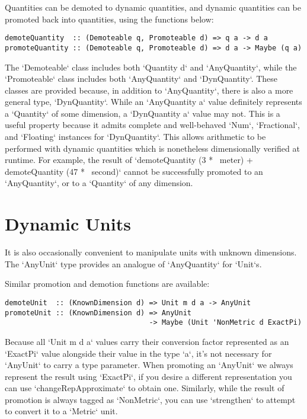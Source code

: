 \documentclass[11pt]{report}
\begin{document}
Quantities can be demoted to dynamic quantities, and dynamic quantities can be promoted back into quantities,
using the functions below:

\begin{lstlisting}
demoteQuantity  :: (Demoteable q, Promoteable d) => q a -> d a
promoteQuantity :: (Demoteable q, Promoteable d) => d a -> Maybe (q a)
\end{lstlisting}

The `Demoteable` class includes both `Quantity d` and `AnyQuantity`, while the `Promoteable` class includes both
`AnyQuantity` and `DynQuantity`. These classes are provided because, in addition to `AnyQuantity`, there is also a more general type, `DynQuantity`.
While an `AnyQuantity a` value definitely represents a `Quantity` of some dimension, a `DynQuantity a` value may not.
This is a useful property because it admits complete and well-behaved `Num`, `Fractional`, and `Floating` instances for `DynQuantity`. This allows
arithmetic to be performed with dynamic quantities which is nonetheless dimensionally verified at runtime. For example,
the result of `demoteQuantity (3 *~ meter) + demoteQuantity (47 *~ second)` cannot be successfully promoted to an
`AnyQuantity`, or to a `Quantity` of any dimension.

\section{Dynamic Units}

It is also occasionally convenient to manipulate units with unknown dimensions. The `AnyUnit` type provides
an analogue of `AnyQuantity` for `Unit`s.

Similar promotion and demotion functions are available:

\begin{lstlisting}
demoteUnit  :: (KnownDimension d) => Unit m d a -> AnyUnit
promoteUnit :: (KnownDimension d) => AnyUnit
                                  -> Maybe (Unit 'NonMetric d ExactPi)
\end{lstlisting}

Because all `Unit m d a` values carry their conversion factor represented as an `ExactPi` value alongside their value in
the type `a`, it's not necessary for `AnyUnit` to carry a type parameter. When promoting an `AnyUnit` we always represent
the result using `ExactPi`, if you desire a different representation you can use `changeRepApproximate` to obtain one.
Similarly, while the result of promotion is always tagged as `NonMetric`, you can use `strengthen` to attempt to convert
it to a `Metric` unit.
\end{document}
